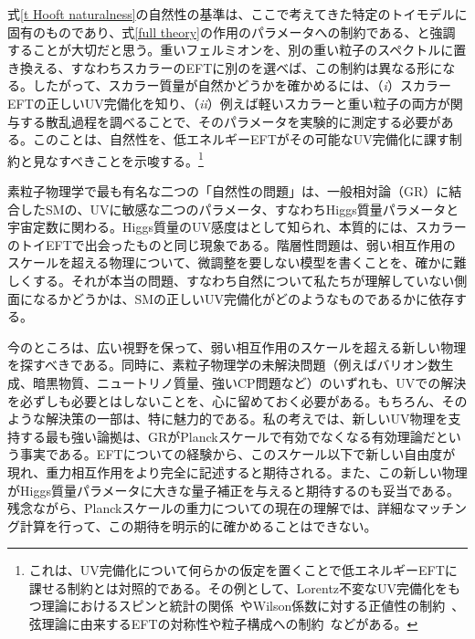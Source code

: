 式\eqref{t Hooft naturalness}の自然性の基準は、ここで考えてきた特定のトイモデルに固有のものであり、式\eqref{full theory}の作用のパラメータへの制約である、と強調することが大切だと思う。重いフェルミオンを、別の重い粒子のスペクトルに置き換える、すなわちスカラーのEFTに別のを選べば、この制約は異なる形になる。したがって、スカラー質量が自然かどうかを確かめるには、（{\it i}）スカラーEFTの正しいUV完備化を知り、（{\it ii}）例えば軽いスカラーと重い粒子の両方が関与する散乱過程を調べることで、そのパラメータを実験的に測定する必要がある。このことは、自然性を、低エネルギーEFTがその可能なUV完備化に課す制約と見なすべきことを示唆する。\footnote{これは、UV完備化について何らかの仮定を置くことで低エネルギーEFTに課せる制約とは対照的である。その例として、Lorentz不変なUV完備化をもつ理論におけるスピンと統計の関係~\cite{Weinberg:1995mt}やWilson係数に対する正値性の制約~\cite{Adams:2006sv}、弦理論に由来するEFTの対称性や粒子構成への制約~\cite{Vafa:2005ui}などがある。}

素粒子物理学で最も有名な二つの「自然性の問題」は、一般相対論（GR）に結合したSMの、UVに敏感な二つのパラメータ、すなわちHiggs質量パラメータと宇宙定数に関わる。Higgs質量のUV感度はとして知られ、本質的には、スカラーのトイEFTで出会ったものと同じ現象である。階層性問題は、弱い相互作用のスケールを超える物理について、微調整を要しない模型を書くことを、確かに難しくする。それが本当の問題、すなわち自然について私たちが理解していない側面になるかどうかは、SMの正しいUV完備化がどのようなものであるかに依存する。

今のところは、広い視野を保って、弱い相互作用のスケールを超える新しい物理を探すべきである。同時に、素粒子物理学の未解決問題（例えばバリオン数生成、暗黒物質、ニュートリノ質量、強いCP問題など）のいずれも、UVでの解決を必ずしも必要とはしないことを、心に留めておく必要がある。もちろん、そのような解決策の一部は、特に魅力的である。私の考えでは、新しいUV物理を支持する最も強い論拠は、GRがPlanckスケールで有効でなくなる有効理論だという事実である。EFTについての経験から、このスケール以下で新しい自由度が現れ、重力相互作用をより完全に記述すると期待される。また、この新しい物理がHiggs質量パラメータに大きな量子補正を与えると期待するのも妥当である。残念ながら、Planckスケールの重力についての現在の理解では、詳細なマッチング計算を行って、この期待を明示的に確かめることはできない。

